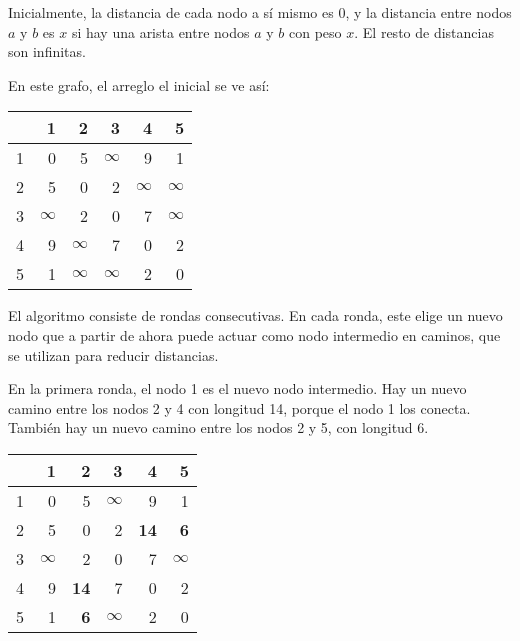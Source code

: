 Inicialmente, la distancia de cada nodo a sí mismo es $0$,
y la distancia entre nodos $a$ y $b$ es $x$ si hay una arista
entre nodos $a$ y $b$ con peso $x$. El resto de distancias son
infinitas.

En este grafo, el arreglo el inicial se ve así:
\begin{center}
    \begin{tabular}{r|rrrrr}
          & 1        & 2        & 3        & 4        & 5        \\
        \hline
        1 & 0        & 5        & $\infty$ & 9        & 1        \\
        2 & 5        & 0        & 2        & $\infty$ & $\infty$ \\
        3 & $\infty$ & 2        & 0        & 7        & $\infty$ \\
        4 & 9        & $\infty$ & 7        & 0        & 2        \\
        5 & 1        & $\infty$ & $\infty$ & 2        & 0        \\
    \end{tabular}
\end{center}
\vspace{10pt}
El algoritmo consiste de rondas consecutivas. En cada ronda, este
elige un nuevo nodo que a partir de ahora puede actuar como nodo
intermedio en caminos, que se utilizan para reducir distancias.

En la primera ronda, el nodo 1 es el nuevo nodo intermedio. Hay un
nuevo camino entre los nodos 2 y 4 con longitud 14, porque el nodo 1
los conecta. También hay un nuevo camino entre los nodos 2 y 5,
con longitud 6.
\begin{center}
    \begin{tabular}{r|rrrrr}
          & 1        & 2           & 3        & 4           & 5          \\
        \hline
        1 & 0        & 5           & $\infty$ & 9           & 1          \\
        2 & 5        & 0           & 2        & \textbf{14} & \textbf{6} \\
        3 & $\infty$ & 2           & 0        & 7           & $\infty$   \\
        4 & 9        & \textbf{14} & 7        & 0           & 2          \\
        5 & 1        & \textbf{6}  & $\infty$ & 2           & 0          \\
    \end{tabular}
\end{center}
\vspace{10pt}

